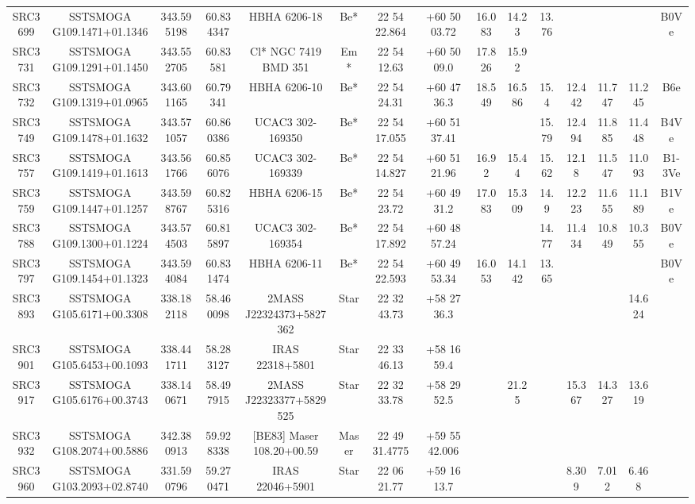 \begin{table}
\begin{tabular}{ccccccccccccccc}
SRC3699 & SSTSMOGA G109.1471+01.1346 & 343.595198 & 60.834347 & HBHA 6206-18 & Be* & 22 54 22.864 & +60 50 03.72 & 16.083 & 14.23 & 13.76 &  &  &  & B0Ve \\
SRC3731 & SSTSMOGA G109.1291+01.1450 & 343.552705 & 60.83581 & Cl* NGC 7419    BMD     351 & Em* & 22 54 12.63 & +60 50 09.0 & 17.826 & 15.92 &  &  &  &  &  \\
SRC3732 & SSTSMOGA G109.1319+01.0965 & 343.601165 & 60.79341 & HBHA 6206-10 & Be* & 22 54 24.31 & +60 47 36.3 & 18.549 & 16.586 & 15.4 & 12.442 & 11.747 & 11.245 & B6e \\
SRC3749 & SSTSMOGA G109.1478+01.1632 & 343.571057 & 60.860386 & UCAC3 302-169350 & Be* & 22 54 17.055 & +60 51 37.41 &  &  & 15.79 & 12.494 & 11.885 & 11.448 & B4Ve \\
SRC3757 & SSTSMOGA G109.1419+01.1613 & 343.561766 & 60.856076 & UCAC3 302-169339 & Be* & 22 54 14.827 & +60 51 21.96 & 16.92 & 15.44 & 15.62 & 12.18 & 11.547 & 11.093 & B1-3Ve \\
SRC3759 & SSTSMOGA G109.1447+01.1257 & 343.598767 & 60.825316 & HBHA 6206-15 & Be* & 22 54 23.72 & +60 49 31.2 & 17.083 & 15.309 & 14.9 & 12.223 & 11.655 & 11.189 & B1Ve \\
SRC3788 & SSTSMOGA G109.1300+01.1224 & 343.574503 & 60.815897 & UCAC3 302-169354 & Be* & 22 54 17.892 & +60 48 57.24 &  &  & 14.77 & 11.434 & 10.849 & 10.355 & B0Ve \\
SRC3797 & SSTSMOGA G109.1454+01.1323 & 343.594084 & 60.831474 & HBHA 6206-11 & Be* & 22 54 22.593 & +60 49 53.34 & 16.053 & 14.142 & 13.65 &  &  &  & B0Ve \\
SRC3893 & SSTSMOGA G105.6171+00.3308 & 338.182118 & 58.460098 & 2MASS J22324373+5827362 & Star & 22 32 43.73 & +58 27 36.3 &  &  &  &  &  & 14.624 &  \\
SRC3901 & SSTSMOGA G105.6453+00.1093 & 338.441711 & 58.283127 & IRAS 22318+5801 & Star & 22 33 46.13 & +58 16 59.4 &  &  &  &  &  &  &  \\
SRC3917 & SSTSMOGA G105.6176+00.3743 & 338.140671 & 58.497915 & 2MASS J22323377+5829525 & Star & 22 32 33.78 & +58 29 52.5 &  & 21.25 &  & 15.367 & 14.327 & 13.619 &  \\
SRC3932 & SSTSMOGA G108.2074+00.5886 & 342.380913 & 59.928338 & [BE83] Maser 108.20+00.59 & Maser & 22 49 31.4775 & +59 55 42.006 &  &  &  &  &  &  &  \\
SRC3960 & SSTSMOGA G103.2093+02.8740 & 331.590796 & 59.270471 & IRAS 22046+5901 & Star & 22 06 21.77 & +59 16 13.7 &  &  &  & 8.309 & 7.012 & 6.468 &  \\

\end{tabular}
\end{table}

